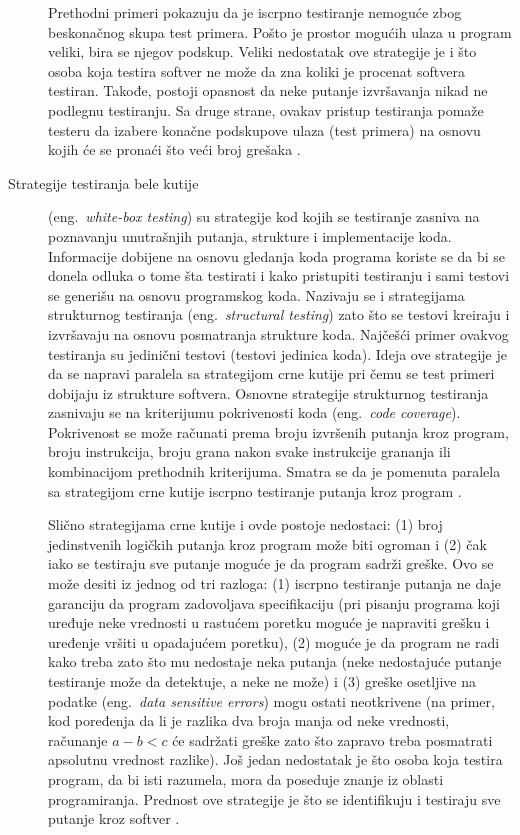 \documentclass[12pt,oneside]{memoir}
\begin{document}
\begin{description}
Prethodni primeri pokazuju da je iscrpno testiranje nemoguće zbog beskonačnog skupa test primera. Pošto je prostor mogućih ulaza u program veliki, bira se njegov podskup. Veliki nedostatak ove strategije je i što osoba koja testira softver ne može da zna koliki je procenat softvera testiran. Takođe, postoji opasnost da neke putanje izvršavanja nikad ne podlegnu testiranju. Sa druge strane, ovakav pristup testiranja pomaže testeru da izabere konačne podskupove ulaza (test primera) na osnovu kojih će se pronaći što veći broj grešaka \cite{ArtOfST, PGtSTD}.

\item [Strategije testiranja bele kutije] (eng.~\textit{white-box testing}) su strategije kod kojih se testiranje zasniva na poznavanju unutrašnjih putanja, strukture i implementacije koda. Informacije dobijene na osnovu gledanja koda programa koriste se da bi se donela odluka o tome šta testirati i kako pristupiti testiranju i sami testovi se generišu na osnovu programskog koda. Nazivaju se i strategijama strukturnog testiranja (eng.~\textit{structural testing}) zato što se testovi kreiraju i izvršavaju na osnovu posmatranja strukture koda. Najčešći primer ovakvog testiranja su jedinični testovi (testovi jedinica koda). Ideja ove strategije je da se napravi paralela sa strategijom crne kutije pri čemu se test primeri dobijaju iz strukture softvera. Osnovne strategije strukturnog testiranja zasnivaju se na kriterijumu pokrivenosti koda (eng.~\textit{code coverage}). Pokrivenost se može računati prema broju izvršenih putanja kroz program, broju instrukcija, broju grana nakon svake instrukcije grananja ili kombinacijom prethodnih kriterijuma. Smatra se da je pomenuta paralela sa strategijom crne kutije iscrpno testiranje putanja kroz program \cite{PGtSTD, SoftTest, mvj, ArtOfST}. 

Slično strategijama crne kutije i ovde postoje nedostaci: (1) broj jedinstvenih logičkih putanja kroz program može biti ogroman i (2) čak iako se testiraju sve putanje moguće je da program sadrži greške. Ovo se može desiti iz jednog od tri razloga: (1) iscrpno testiranje putanja ne daje garanciju da program zadovoljava specifikaciju (pri pisanju programa koji uređuje neke vrednosti u rastućem poretku moguće je napraviti grešku i uređenje vršiti u opadajućem poretku), (2) moguće je da program ne radi kako treba zato što mu nedostaje neka putanja (neke nedostajuće putanje testiranje može da detektuje, a neke ne može) i (3) greške osetljive na podatke (eng.~\textit{data sensitive errors}) mogu ostati neotkrivene (na primer, kod poređenja da li je razlika dva broja manja od neke vrednosti, računanje $a-b<c$ će sadržati greške zato što zapravo treba posmatrati apsolutnu vrednost razlike). Još jedan nedostatak je što osoba koja testira program, da bi isti razumela, mora da poseduje znanje iz oblasti programiranja. Prednost ove strategije je što se identifikuju i testiraju sve putanje kroz softver \cite{mvj, ArtOfST, PGtSTD}.


\end{description}
\end{document}
